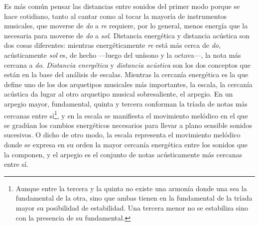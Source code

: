 \documentclass[a4paper,10pt]{article}
\begin{document}
\begin{multicols}{2}
  Es más común pensar las distancias entre sonidos del primer modo porque se hace cotidiano, tanto al cantar como al tocar la mayoría de instrumentos musicales, que moverse de \emph{do} a \emph{re} requiere, por lo general, menos energía que la necesaria para moverse de \emph{do} a \emph{sol}. Distancia energética y distancia acústica son dos cosas diferentes: mientras energéticamente \emph{re} está más cerca de \emph{do}, acústicamente \emph{sol} es, de hecho ---luego del unísono y la \hbox{octava---,} la nota más cercana a \emph{do}. \emph{Distancia energética} y \emph{distancia acústica} son los dos conceptos que están en la base del análisis de escalas. Mientras la cercanía energética es la que define uno de los dos arquetipos musicales más importantes, la escala, la cercanía acústica da lugar al otro arquetipo musical sobresaliente, el arpegio. En un arpegio mayor, fundamental, quinta y tercera conforman la tríada de notas más cercanas entre sí\footnote{Aunque entre la tercera y la quinta no existe una armonía donde una sea la fundamental de la otra, sino que ambas tienen en la fundamental de la tríada mayor su posibilidad de estabilidad. Una tercera menor no se estabiliza sino con la presencia de su fundamental.}, y en la escala se manifiesta el movimiento melódico en el que se gradúan los cambios energéticos necesarios para llevar a plano sensible sonidos sucesivos. O dicho de otro modo, la escala representa el movimiento melódico donde se expresa en su orden la mayor cercanía energética entre los sonidos que la componen, y el arpegio es el conjunto de notas acústicamente más cercanas entre sí.
\end{multicols}
\end{document}
